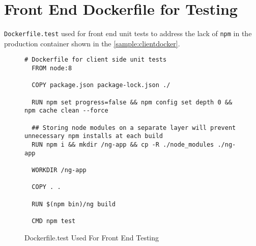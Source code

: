 \newpage
\section{Front End Dockerfile for Testing}
\texttt{Dockerfile.test} used for front end unit tests to address the lack of \texttt{npm}
in the production container shown in the \autoref{sample:clientdocker}.

\begin{figure}[ht]
  \begin{lstlisting}[basicstyle=\small, breaklines=true]
  # Dockerfile for client side unit tests
  FROM node:8

  COPY package.json package-lock.json ./

  RUN npm set progress=false && npm config set depth 0 && npm cache clean --force

  ## Storing node modules on a separate layer will prevent unnecessary npm installs at each build
  RUN npm i && mkdir /ng-app && cp -R ./node_modules ./ng-app

  WORKDIR /ng-app

  COPY . .

  RUN $(npm bin)/ng build

  CMD npm test
  \end{lstlisting}
  \caption{Dockerfile.test Used For Front End Testing}
  \label{sample:clientdockertest}
\end{figure}
